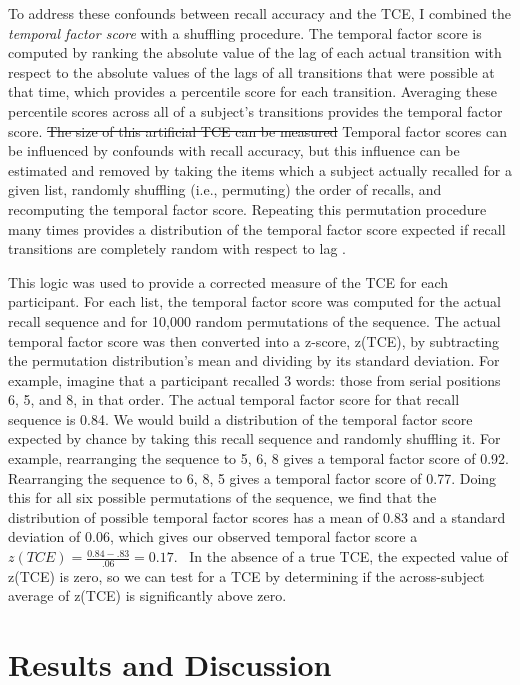 \documentclass[man,natbib,floatsintext]{apa6} %
\begin{document}
To address these confounds between recall accuracy and the TCE, I combined the \emph{temporal factor score} \citep{SedeEtal10,PolyEtal09} with a shuffling procedure\color{black}. The temporal factor score is computed by ranking the absolute value of the lag of each actual transition with respect to the absolute values of the lags of all transitions that were possible at that time, which provides a percentile score for each transition. Averaging these percentile scores across all of a subject's transitions provides the temporal factor score.
\st{The size of this artificial TCE can be measured} \color{red}Temporal factor scores can be influenced by confounds with recall accuracy, but this influence can be estimated and removed \color{black} by taking the items which a subject actually recalled for a given list, randomly shuffling (i.e., permuting) the order of recalls, and recomputing the temporal factor score. Repeating this permutation procedure many times provides a distribution of the temporal factor score expected if recall transitions are completely random with respect to lag \citep{HealKaha17}. 

This logic was used to provide a corrected measure of the TCE for each participant. For each list, the temporal factor score was computed for the actual recall sequence and for 10,000 random permutations of the sequence. The actual temporal factor score was then converted into a z-score, z(TCE), by subtracting the permutation distribution's mean and dividing by its standard deviation.  \color{red}\label{TCEex} For example, imagine that a participant recalled 3 words: those from serial positions 6, 5, and 8, in that order. The actual temporal factor score for that recall sequence is 0.84. We would build a distribution of the temporal factor score expected by chance by taking this recall sequence and randomly shuffling it. For example, rearranging the sequence to 5, 6, 8 gives a temporal factor score of 0.92. Rearranging the sequence to 6, 8, 5 gives a temporal factor score of 0.77. Doing this for all six possible permutations of the sequence, we find that the distribution of possible temporal factor scores has a mean of 0.83 and a standard deviation of 0.06, which gives our observed temporal factor score a $z(TCE)=\frac{0.84-.83}{.06}=0.17$. \color{black}~In the absence of a true TCE, the expected value of z(TCE) is zero, so we can test for a TCE by determining if the across-subject average of z(TCE) is significantly above zero.  



\section{Results and Discussion}
\end{document}
